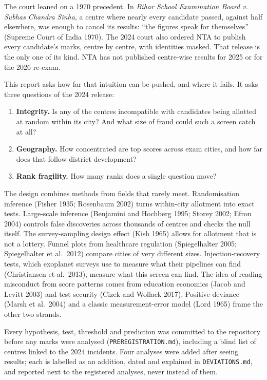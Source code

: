 \documentclass[11pt]{article}
\begin{document}
The court leaned on a 1970 precedent. In \textit{Bihar School Examination Board v. Subhas Chandra Sinha}, a centre where nearly every candidate passed, against half elsewhere, was enough to cancel its results: ``the figures speak for themselves'' (Supreme Court of India 1970). The 2024 court also ordered NTA to publish every candidate's marks, centre by centre, with identities masked. That release is the only one of its kind. NTA has not published centre-wise results for 2025 or for the 2026 re-exam.

This report asks how far that intuition can be pushed, and where it fails. It asks three questions of the 2024 release:
\begin{enumerate}[leftmargin=1.5em]
\item \textbf{Integrity.} Is any of the \Centres{} centres incompatible with candidates being allotted at random within its city? And what size of fraud could such a screen catch at all?
\item \textbf{Geography.} How concentrated are top scores across exam cities, and how far does that follow district development?
\item \textbf{Rank fragility.} How many ranks does a single question move?
\end{enumerate}

The design combines methods from fields that rarely meet. Randomisation inference (Fisher 1935; Rosenbaum 2002) turns within-city allotment into exact tests. Large-scale inference (Benjamini and Hochberg 1995; Storey 2002; Efron 2004) controls false discoveries across thousands of centres and checks the null itself. The survey-sampling design effect (Kish 1965) allows for allotment that is not a lottery. Funnel plots from healthcare regulation (Spiegelhalter 2005; Spiegelhalter et al.\ 2012) compare cities of very different sizes. Injection-recovery tests, which exoplanet surveys use to measure what their pipelines can find (Christiansen et al.\ 2013), measure what this screen can find. The idea of reading misconduct from score patterns comes from education economics (Jacob and Levitt 2003) and test security (Cizek and Wollack 2017). Positive deviance (Marsh et al.\ 2004) and a classic measurement-error model (Lord 1965) frame the other two strands.

Every hypothesis, test, threshold and prediction was committed to the repository before any marks were analysed (\texttt{PREREGISTRATION.md}), including a blind list of centres linked to the 2024 incidents. Four analyses were added after seeing results; each is labelled as an addition, dated and explained in \texttt{DEVIATIONS.md}, and reported next to the registered analyses, never instead of them.
\end{document}
